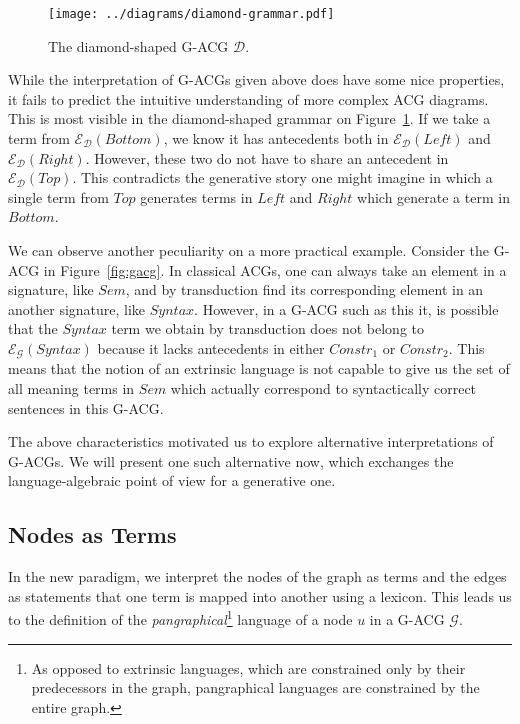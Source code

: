 \documentclass{llncs}
\begin{document}
\begin{figure}
  \centering
  \texttt{[image: ../diagrams/diamond-grammar.pdf]}
  \caption{\label{fig:diamond} The diamond-shaped G-ACG $\mathcal{D}$.}
\end{figure}

While the interpretation of G-ACGs given above does have some nice properties,
it fails to predict the intuitive understanding of more complex ACG
diagrams. This is most visible in the diamond-shaped grammar on
Figure~\ref{fig:diamond}. If we take a term from
$\mathcal{E}_{\mathcal{D}}(Bottom)$, we know it has antecedents both in
$\mathcal{E}_{\mathcal{D}}(Left)$ and
$\mathcal{E}_{\mathcal{D}}(Right)$. However, these two do not have to share an
antecedent in $\mathcal{E}_{\mathcal{D}}(Top)$. This contradicts the
generative story one might imagine in which a single term from $Top$ generates
terms in $Left$ and $Right$ which generate a term in $Bottom$.

We can observe another peculiarity on a more practical example. Consider the
G-ACG in Figure~\ref{fig:gacg}. In classical ACGs, one can always take an
element in a signature, like $Sem$, and by transduction find its corresponding
element in an another signature, like $Syntax$. However, in a G-ACG such as
this it, is possible that the $Syntax$ term we obtain by transduction does not
belong to $\mathcal{E}_{\mathcal{G}}(Syntax)$ because it lacks antecedents in
either $Constr_1$ or $Constr_2$. This means that the notion of an extrinsic
language is not capable to give us the set of all meaning terms in $Sem$ which
actually correspond to syntactically correct sentences in this G-ACG.

The above characteristics motivated us to explore alternative interpretations
of G-ACGs. We will present one such alternative now, which exchanges the
language-algebraic point of view for a generative one.

\subsection{Nodes as Terms}

In the new paradigm, we interpret the nodes of the graph as terms and the
edges as statements that one term is mapped into another using a lexicon. This
leads us to the definition of the \emph{pangraphical}\footnote{As opposed to
  extrinsic languages, which are constrained only by their predecessors in the
  graph, pangraphical languages are constrained by the entire graph.} language
of a node $u$ in a G-ACG $\mathcal{G}$.
\end{document}
